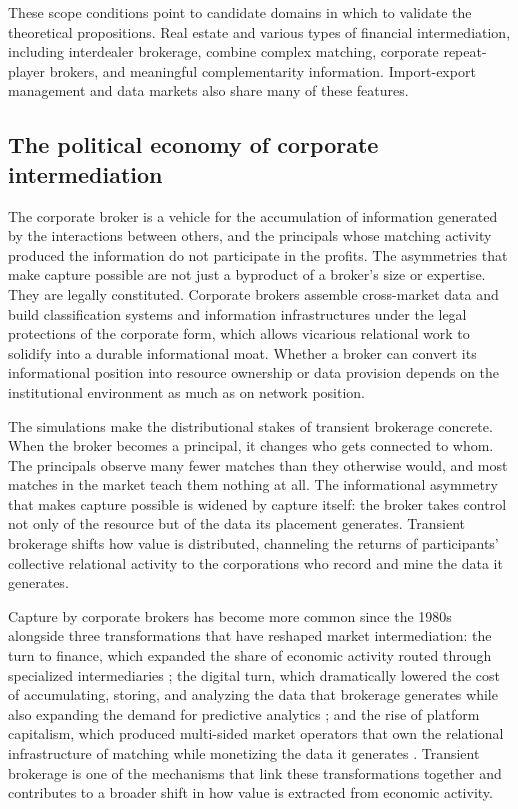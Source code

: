 \documentclass[
]{article}
\begin{document}
These scope conditions point to candidate domains in which to validate the theoretical propositions. Real estate and various types of financial intermediation, including interdealer brokerage, combine complex matching, corporate repeat-player brokers, and meaningful complementarity information. Import-export management and data markets also share many of these features.

\subsection{The political economy of corporate intermediation}

The corporate broker is a vehicle for the accumulation of information generated by the interactions between others, and the principals whose matching activity produced the information do not participate in the profits. The asymmetries that make capture possible are not just a byproduct of a broker's size or expertise. They are legally constituted. Corporate brokers assemble cross-market data and build classification systems and information infrastructures under the legal protections of the corporate form, which allows vicarious relational work to solidify into a durable informational moat. Whether a broker can convert its informational position into resource ownership or data provision depends on the institutional environment as much as on network position.

The simulations make the distributional stakes of transient brokerage concrete. When the broker becomes a principal, it changes who gets connected to whom. The principals observe many fewer matches than they otherwise would, and most matches in the market teach them nothing at all. The informational asymmetry that makes capture possible is widened by capture itself: the broker takes control not only of the resource but of the data its placement generates. Transient brokerage shifts how value is distributed, channeling the returns of participants' collective relational activity to the corporations who record and mine the data it generates.

Capture by corporate brokers has become more common since the 1980s alongside three transformations that have reshaped market intermediation: the turn to finance, which expanded the share of economic activity routed through specialized intermediaries \autocite{carruthersFinancializationInstitutionalFoundations2015,krippnerCapitalizingCrisisPolitical2011}; the digital turn, which dramatically lowered the cost of accumulating, storing, and analyzing the data that brokerage generates while also expanding the demand for predictive analytics \autocite{cohenTruthPowerLegal2019,gandyPanopticSortPolitical1993}; and the rise of platform capitalism, which produced multi-sided market operators that own the relational infrastructure of matching while monetizing the data it generates \autocite{sadowskiInternetLandlordsDigital2020,viljoenDesignChoicesMechanism2021}. Transient brokerage is one of the mechanisms that link these transformations together and contributes to a broader shift in how value is extracted from economic activity.
\end{document}
